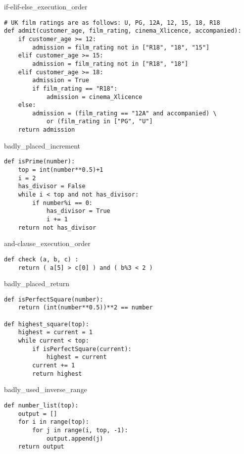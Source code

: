 \begin{chunk}{if-elif-else_execution_order}
\begin{lstlisting}
# UK film ratings are as follows: U, PG, 12A, 12, 15, 18, R18
def admit(customer_age, film_rating, cinema_Xlicence, accompanied):
    if customer_age >= 12:
        admission = film_rating not in ["R18", "18", "15"]
    elif customer_age >= 15:
        admission = film_rating not in ["R18", "18"]
    elif customer_age >= 18:
        admission = True
        if film_rating == "R18":
            admission = cinema_Xlicence
    else:
        admission = (film_rating == "12A" and accompanied) \
            or (film_rating in ["PG", "U"]
    return admission
\end{lstlisting}
\end{chunk}

\begin{chunk}{badly_placed_increment}
\begin{lstlisting}
def isPrime(number):
    top = int(number**0.5)+1
    i = 2
    has_divisor = False
    while i < top and not has_divisor:
        if number%i == 0:
            has_divisor = True
            i += 1
    return not has_divisor
\end{lstlisting}
\end{chunk}

\begin{chunk}{and-clause_execution_order}
\begin{lstlisting}
def check (a, b, c) :
    return ( a[5] > c[0] ) and ( b%3 < 2 )
\end{lstlisting}
\end{chunk}

\begin{chunk}{badly_placed_return}
\begin{lstlisting}
def isPerfectSquare(number):
    return (int(number**0.5))**2 == number

def highest_square(top):
    highest = current = 1
    while current < top:
        if isPerfectSquare(current):
            highest = current
        current += 1
        return highest
\end{lstlisting}
\end{chunk}

\begin{chunk}{badly_used_inverse_range}
\begin{lstlisting}
def number_list(top):
    output = []
    for i in range(top):
        for j in range(i, top, -1):
            output.append(j)
    return output
\end{lstlisting}
\end{chunk}

